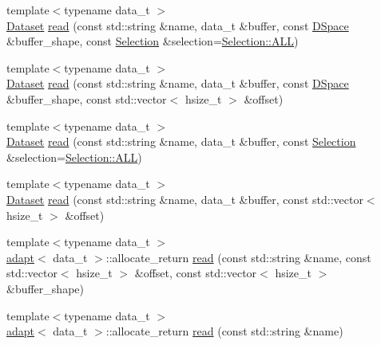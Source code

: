 \begin{DoxyCompactItemize}
{\footnotesize template$<$typename data\-\_\-t $>$ }\\\hyperlink{class_h5_t_l_1_1_dataset}{Dataset} \hyperlink{class_h5_t_l_1_1_group_ac23072a42de2e938f27e64ea0cd9d96f}{read} (const std\-::string \&name, data\-\_\-t \&buffer, const \hyperlink{class_h5_t_l_1_1_d_space}{D\-Space} \&buffer\-\_\-shape, const \hyperlink{class_h5_t_l_1_1_selection}{Selection} \&selection=\hyperlink{class_h5_t_l_1_1_selection_a32d830ebff3c607e0425fa5d6ef72df0}{Selection\-::\-A\-L\-L})
\item 
{\footnotesize template$<$typename data\-\_\-t $>$ }\\\hyperlink{class_h5_t_l_1_1_dataset}{Dataset} \hyperlink{class_h5_t_l_1_1_group_ab8333c1f74f0d82b87b0a3056b36bfa7}{read} (const std\-::string \&name, data\-\_\-t \&buffer, const \hyperlink{class_h5_t_l_1_1_d_space}{D\-Space} \&buffer\-\_\-shape, const std\-::vector$<$ hsize\-\_\-t $>$ \&offset)
\item 
{\footnotesize template$<$typename data\-\_\-t $>$ }\\\hyperlink{class_h5_t_l_1_1_dataset}{Dataset} \hyperlink{class_h5_t_l_1_1_group_a60f8bb8b3a76fa457331a375172fc716}{read} (const std\-::string \&name, data\-\_\-t \&buffer, const \hyperlink{class_h5_t_l_1_1_selection}{Selection} \&selection=\hyperlink{class_h5_t_l_1_1_selection_a32d830ebff3c607e0425fa5d6ef72df0}{Selection\-::\-A\-L\-L})
\item 
{\footnotesize template$<$typename data\-\_\-t $>$ }\\\hyperlink{class_h5_t_l_1_1_dataset}{Dataset} \hyperlink{class_h5_t_l_1_1_group_acc0a96894857a334132329442482803b}{read} (const std\-::string \&name, data\-\_\-t \&buffer, const std\-::vector$<$ hsize\-\_\-t $>$ \&offset)
\item 
{\footnotesize template$<$typename data\-\_\-t $>$ }\\\hyperlink{struct_h5_t_l_1_1adapt}{adapt}$<$ data\-\_\-t $>$\-::allocate\-\_\-return \hyperlink{class_h5_t_l_1_1_group_a3ebe23fce9aecac979096da6a71db0c5}{read} (const std\-::string \&name, const std\-::vector$<$ hsize\-\_\-t $>$ \&offset, const std\-::vector$<$ hsize\-\_\-t $>$ \&buffer\-\_\-shape)
\item 
{\footnotesize template$<$typename data\-\_\-t $>$ }\\\hyperlink{struct_h5_t_l_1_1adapt}{adapt}$<$ data\-\_\-t $>$\-::allocate\-\_\-return \hyperlink{class_h5_t_l_1_1_group_a24d333709b9200ecc94c51f4081ebd70}{read} (const std\-::string \&name)
\item 

\end{DoxyCompactItemize}
